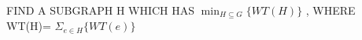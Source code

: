 \documentclass[preview]{standalone}
\begin{document}
\begin{center}
FIND   A   SUBGRAPH   H  WHICH   HAS $\min_{\scriptscriptstyle H \subseteq G} \{ WT(H) \}$ ,  WHERE   WT(H)= $\Sigma_{e \in H} \{ WT(e) \}$
\end{center}
\end{document}

